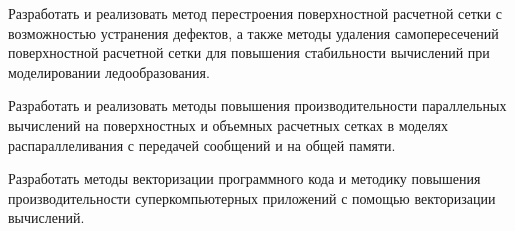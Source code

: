 \item Разработать и реализовать метод перестроения поверхностной расчетной сетки с возможностью устранения дефектов, а также методы удаления самопересечений поверхностной расчетной сетки для повышения стабильности вычислений при моделировании ледообразования.
\item Разработать и реализовать методы повышения производительности параллельных вычислений на поверхностных и объемных расчетных сетках в моделях распараллеливания с передачей сообщений и на общей памяти.
\item Разработать методы векторизации программного кода и методику повышения производительности суперкомпьютерных приложений с помощью векторизации вычислений.
